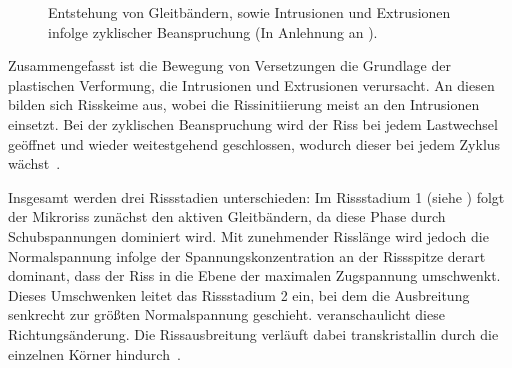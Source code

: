 \begin{figure}[H]
    \caption{Entstehung von Gleitbändern, sowie Intrusionen und Extrusionen infolge zyklischer Beanspruchung (In Anlehnung an \cite[Seite 8]{Ermüdungsfestigkeit2007}).}
    \label{fig:gleitbaender-mechanismus}
\end{figure}

Zusammengefasst ist die Bewegung von Versetzungen die Grundlage der plastischen Verformung, die Intrusionen und Extrusionen verursacht. An diesen bilden sich Risskeime aus, wobei die Rissinitiierung meist an den Intrusionen einsetzt. Bei der zyklischen Beanspruchung wird der Riss bei jedem Lastwechsel geöffnet und wieder weitestgehend geschlossen, wodurch dieser bei jedem Zyklus wächst~\cite[Seite~267--268]{Werkstofftechnik-Praktikum2021}. 

Insgesamt werden drei Rissstadien unterschieden: Im Rissstadium 1 (siehe ) folgt der Mikroriss zunächst den aktiven Gleitbändern, da diese Phase durch Schubspannungen dominiert wird. Mit zunehmender Risslänge wird jedoch die Normalspannung infolge der Spannungskonzentration an der Rissspitze derart dominant, dass der Riss in die Ebene der maximalen Zugspannung umschwenkt. Dieses Umschwenken leitet das Rissstadium 2 ein, bei dem die Ausbreitung senkrecht zur größten Normalspannung geschieht.  veranschaulicht diese Richtungsänderung. Die Rissausbreitung verläuft dabei transkristallin durch die einzelnen Körner hindurch~\cite[Seite~267--268]{Werkstofftechnik-Praktikum2021}.

